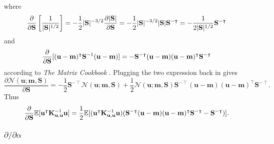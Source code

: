 \documentclass{mprop}
\theoremstyle{definition}
\begin{document}
where
\[ \frac{\partial}{\partial\mathbf{S}}\left[\frac{1}{|\mathbf{S}|^{1/2}}\right] =
  -\frac{1}{2}|\mathbf{S}|^{-3/2}\frac{\partial |\mathbf{S}|}{\partial \mathbf{S}} =
  -\frac{1}{2}|\mathbf{S}|^{-3/2}|\mathbf{S}|\mathbf{S}^{-\intercal} =
  -\frac{1}{2|\mathbf{S}|^{1/2}}\mathbf{S}^{-\intercal} \]
and
\[ \frac{\partial}{\partial\mathbf{S}}[(\mathbf{u} - \mathbf{m})^\intercal\mathbf{S}^{-1}(\mathbf{u} -
  \mathbf{m})] = -\mathbf{S}^{-\intercal}(\mathbf{u} - \mathbf{m})(\mathbf{u} -
  \mathbf{m})^\intercal\mathbf{S}^{-\intercal} \]
according to \textit{The Matrix Cookbook} \cite{petersen2008matrix}. Plugging
the two expression back in gives
\[ \frac{\partial \mathcal{N}(\mathbf{u}; \mathbf{m}, \mathbf{S})}{\partial
    \mathbf{S}} = -\frac{1}{2}\mathbf{S}^{-\intercal}\mathcal{N}(\mathbf{u};
  \mathbf{m}, \mathbf{S}) + \frac{1}{2}\mathcal{N}(\mathbf{u}; \mathbf{m},
  \mathbf{S})\mathbf{S}^{-\intercal}(\mathbf{u} - \mathbf{m})(\mathbf{u} -
  \mathbf{m})^\intercal\mathbf{S}^{-\intercal}. \]
Thus
\[ \frac{\partial}{\partial\mathbf{S}}\mathbb{E}[\mathbf{u}^\intercal\mathbf{K}_{\mathbf{u},\mathbf{u}}^{-1}\mathbf{u}] =
  \frac{1}{2}\mathbb{E}[(\mathbf{u}^\intercal\mathbf{K}_{\mathbf{u},\mathbf{u}}^{-1}\mathbf{u})(\mathbf{S}^{-\intercal}(\mathbf{u}
  - \mathbf{m})(\mathbf{u} - \mathbf{m})^\intercal\mathbf{S}^{-\intercal} -
  \mathbf{S}^{-\intercal})]. \]

\subsubsection{$\partial/\partial\alpha$}
\end{document}
